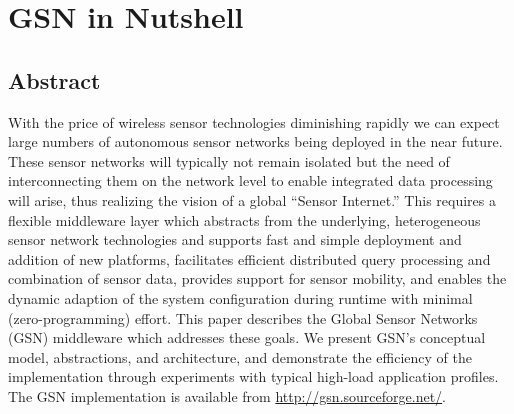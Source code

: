\chapter{GSN in Nutshell}%

\section*{Abstract}
  With the price of wireless sensor technologies diminishing rapidly we can
  expect large numbers of autonomous sensor networks being deployed in the near
  future. These sensor networks will typically not remain isolated but the need
  of interconnecting them on the network level to enable integrated data
  processing will arise, thus realizing the vision of a global ``Sensor
  Internet.'' This requires a flexible middleware layer which abstracts from
  the underlying, heterogeneous sensor network technologies and supports fast
  and simple deployment and addition of new platforms, facilitates efficient
  distributed query processing and combination of sensor data, provides support
  for sensor mobility, and enables the dynamic adaption of the system
  configuration during runtime with minimal (zero-programming) effort. This
  paper describes the Global Sensor Networks (GSN) middleware which addresses
  these goals. We present GSN's conceptual model, abstractions, and
  architecture, and demonstrate the efficiency of the implementation through
  experiments with typical high-load application profiles. The GSN
  implementation is available from \url{http://gsn.sourceforge.net/}.
\newpage
